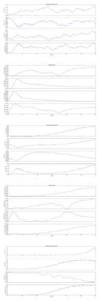 \begin{figure}
\centering
	\begin{subfloat}[]{
		\includegraphics[width=0.45\textwidth]{CONTENT/Figure/figure5_2_a.png}
		\label{fig:fig5-2-a}}
	\end{subfloat}\qquad
	\begin{subfloat}[]{
		\includegraphics[width=0.45\textwidth]{CONTENT/Figure/figure5_2_b.png}
		\label{fig:fig5-2-b}}
	\end{subfloat}
		\begin{subfloat}[]{
		\includegraphics[width=0.45\textwidth]{CONTENT/Figure/figure5_2_c.png}
		\label{fig:fig5-2-c}}
	\end{subfloat}\qquad
	\begin{subfloat}[]{
		\includegraphics[width=0.45\textwidth]{CONTENT/Figure/figure5_2_d.png}
		\label{fig:fig5-2-d}}
	\end{subfloat}
		\begin{subfloat}[]{
		\includegraphics[width=0.45\textwidth]{CONTENT/Figure/figure5_2_e.png}
		\label{fig:fig5-2-e}}

\end{subfloat}
\end{figure}
